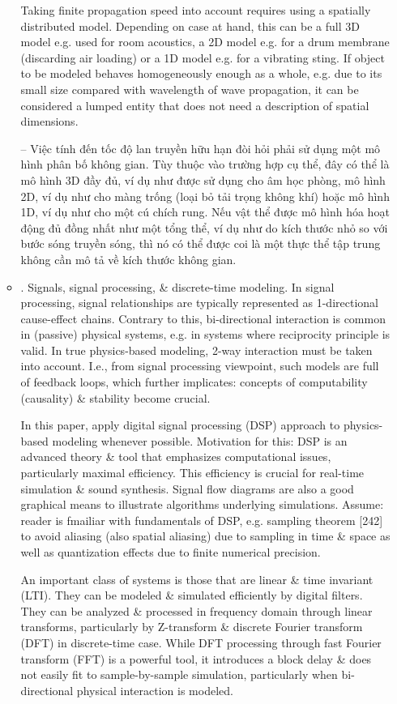 \documentclass{article}
\begin{document}
\begin{itemize}
\begin{itemize}
		Taking finite propagation speed into account requires using a spatially distributed model. Depending on case at hand, this can be a full 3D model e.g. used for room acoustics, a 2D model e.g. for a drum membrane (discarding air loading) or a 1D model e.g. for a vibrating sting. If object to be modeled behaves homogeneously enough as a whole, e.g. due to its small size compared with wavelength of wave propagation, it can be considered a lumped entity that does not need a description of spatial dimensions.
		
		-- Việc tính đến tốc độ lan truyền hữu hạn đòi hỏi phải sử dụng một mô hình phân bố không gian. Tùy thuộc vào trường hợp cụ thể, đây có thể là mô hình 3D đầy đủ, ví dụ như được sử dụng cho âm học phòng, mô hình 2D, ví dụ như cho màng trống (loại bỏ tải trọng không khí) hoặc mô hình 1D, ví dụ như cho một cú chích rung. Nếu vật thể được mô hình hóa hoạt động đủ đồng nhất như một tổng thể, ví dụ như do kích thước nhỏ so với bước sóng truyền sóng, thì nó có thể được coi là một thực thể tập trung không cần mô tả về kích thước không gian.
		\item {. Signals, signal processing, \& discrete-time modeling.} In signal processing, signal relationships are typically represented as 1-directional cause-effect chains. Contrary to this, bi-directional interaction is common in (passive) physical systems, e.g. in systems where reciprocity principle is valid. In true physics-based modeling, 2-way interaction must be taken into account. I.e., from signal processing viewpoint, such models are full of feedback loops, which further implicates: concepts of computability (causality) \& stability become crucial.
		
		In this paper, apply digital signal processing (DSP) approach to physics-based modeling whenever possible. Motivation for this: DSP is an advanced theory \& tool that emphasizes computational issues, particularly maximal efficiency. This efficiency is crucial for real-time simulation \& sound synthesis. Signal flow diagrams are also a good graphical means to illustrate algorithms underlying simulations. Assume: reader is fmailiar with fundamentals of DSP, e.g. sampling theorem [242] to avoid aliasing (also spatial aliasing) due to sampling in time \& space as well as quantization effects due to finite numerical precision.
		
		An important class of systems is those that are linear \& time invariant (LTI). They can be modeled \& simulated efficiently by digital filters. They can be analyzed \& processed in frequency domain through linear transforms, particularly by Z-transform \& discrete Fourier transform (DFT) in discrete-time case. While DFT processing through fast Fourier transform (FFT) is a powerful tool, it introduces a block delay \& does not easily fit to sample-by-sample simulation, particularly when bi-directional physical interaction is modeled.
		

\end{itemize}
\end{itemize}
\end{document}
